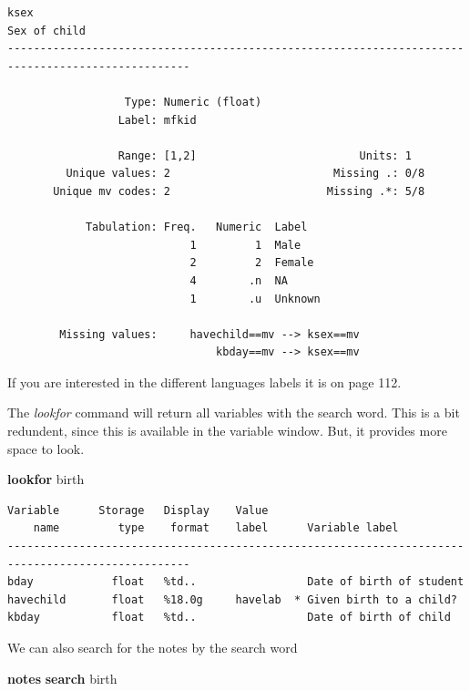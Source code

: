 \documentclass[
]{book}
\newenvironment{Shaded}{\begin{snugshade}}{\end{snugshade}}
\newcommand{\KeywordTok}[1]{\textcolor[rgb]{0.13,0.29,0.53}{\textbf{#1}}}
\newcommand{\NormalTok}[1]{#1}
\begin{document}
\begin{verbatim}
ksex                                                                                  Sex of child
--------------------------------------------------------------------------------------------------

                  Type: Numeric (float)
                 Label: mfkid

                 Range: [1,2]                         Units: 1
         Unique values: 2                         Missing .: 0/8
       Unique mv codes: 2                        Missing .*: 5/8

            Tabulation: Freq.   Numeric  Label
                            1         1  Male
                            2         2  Female
                            4        .n  NA
                            1        .u  Unknown

        Missing values:     havechild==mv --> ksex==mv
                                kbday==mv --> ksex==mv
\end{verbatim}

If you are interested in the different languages labels it is on page 112.

The \emph{lookfor} command will return all variables with the search word. This is a bit redundent, since this is available in the variable window. But, it provides more space to look.

\begin{Shaded}
\begin{Highlighting}[]
\KeywordTok{lookfor}\NormalTok{ birth}
\end{Highlighting}
\end{Shaded}

\begin{verbatim}
Variable      Storage   Display    Value
    name         type    format    label      Variable label
--------------------------------------------------------------------------------------------------
bday            float   %td..                 Date of birth of student
havechild       float   %18.0g     havelab  * Given birth to a child?
kbday           float   %td..                 Date of birth of child
\end{verbatim}

We can also search for the notes by the search word

\begin{Shaded}
\begin{Highlighting}[]
\KeywordTok{notes} \KeywordTok{search}\NormalTok{ birth}
\end{Highlighting}
\end{Shaded}
\end{document}
